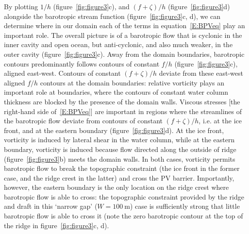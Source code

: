 \documentclass[draft]{agujournal2019}
\begin{document}
By plotting $1/h$ (figure~\ref{fig:figure3}c), and $(f + \zeta)/h$ (figure~\ref{fig:figure3}d) alongside the barotropic stream function (figure~\ref{fig:figure3}c, d), we can determine where in our domain each of the terms in equation~\eqref{E:BPVeq} play an important role. The overall picture is of a barotropic flow that is cyclonic in the inner cavity and open ocean, but anti-cyclonic, and also much weaker, in the outer cavity (figure~\ref{fig:figure3}c). Away from the domain boundaries, barotropic contours predominantly follows contours of constant $f/h$ (figure~\ref{fig:figure3}c), aligned east-west.  Contours of constant $(f + \zeta)/h$ deviate from these east-west aligned $f/h$ contours at the domain boundaries: relative vorticity plays an important role at boundaries, where the contours of constant water column thickness are blocked by the presence of the domain walls. Viscous stresses [the right-hand side of~\eqref{E:BPVeq}] are important in regions where the streamlines of the barotropic flow deviate from contours of constant $(f + \zeta)/h$, i.e. at the ice front, and at the eastern boundary (figure~\ref{fig:figure3}d). At the ice front, vorticity is induced by lateral shear in the water column, while at the eastern boundary, vorticity is induced because flow directed along the outside of ridge (figure~\ref{fig:figure3}b) meets the domain walls. In both cases, vorticity permits barotropic flow to break the topographic constraint (the ice front in the former case, and the ridge crest in the latter) and cross the PV barrier. Importantly, however, the eastern boundary is the only location on the ridge crest where barotropic flow is able to cross: the topographic constraint provided by the ridge and draft in this `narrow gap' ($W=100~\text{m}$) case is sufficiently strong that little barotropic flow is able to cross it (note the zero barotropic contour at the top of the ridge in figure~\ref{fig:figure3}c, d).

\end{document}

